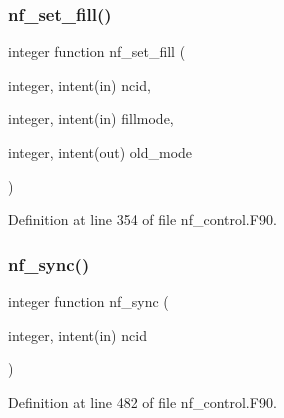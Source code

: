 \subsubsection{\texorpdfstring{nf\+\_\+set\+\_\+fill()}{nf\_set\_fill()}}
{\footnotesize\ttfamily integer function nf\+\_\+set\+\_\+fill (\begin{DoxyParamCaption}\item[{integer, intent(in)}]{ncid,  }\item[{integer, intent(in)}]{fillmode,  }\item[{integer, intent(out)}]{old\+\_\+mode }\end{DoxyParamCaption})}



Definition at line 354 of file nf\+\_\+control.\+F90.

\mbox{\label{nf__control_8F90_ad8cafefd0124b15508206b09f6c85f3e}} 
\subsubsection{\texorpdfstring{nf\+\_\+sync()}{nf\_sync()}}
{\footnotesize\ttfamily integer function nf\+\_\+sync (\begin{DoxyParamCaption}\item[{integer, intent(in)}]{ncid }\end{DoxyParamCaption})}



Definition at line 482 of file nf\+\_\+control.\+F90.

